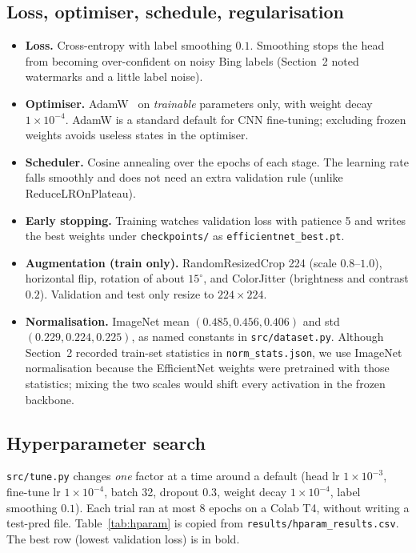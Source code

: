 \subsection{Loss, optimiser, schedule, regularisation}
\begin{itemize}
  \item \textbf{Loss.} Cross-entropy with label smoothing $0.1$. Smoothing
        stops the head from becoming over-confident on noisy Bing labels
        (Section~2 noted watermarks and a little label noise).
  \item \textbf{Optimiser.} AdamW~\cite{loshchilov2019adamw} on \emph{trainable}
        parameters only, with weight decay $1 \times 10^{-4}$. AdamW is a
        standard default for CNN fine-tuning; excluding frozen weights avoids
        useless states in the optimiser.
  \item \textbf{Scheduler.} Cosine annealing over the epochs of each stage.
        The learning rate falls smoothly and does not need an extra validation
        rule (unlike ReduceLROnPlateau).
  \item \textbf{Early stopping.} Training watches validation loss with
        patience 5 and writes the best weights under \texttt{checkpoints/}
        as \texttt{efficientnet\_best.pt}.
  \item \textbf{Augmentation (train only).} RandomResizedCrop 224 (scale
        $0.8$--$1.0$), horizontal flip, rotation of about $15^{\circ}$, and
        ColorJitter (brightness and contrast $0.2$). Validation and test
        only resize to $224 \times 224$.
  \item \textbf{Normalisation.} ImageNet mean $(0.485, 0.456, 0.406)$ and
        std $(0.229, 0.224, 0.225)$, as named constants in
        \texttt{src/dataset.py}. Although Section~2 recorded train-set
        statistics in \texttt{norm\_stats.json}, we use ImageNet normalisation
        because the EfficientNet weights were pretrained with those statistics;
        mixing the two scales would shift every activation in the frozen
        backbone.
\end{itemize}

\subsection{Hyperparameter search}
\texttt{src/tune.py} changes \emph{one} factor at a time around a default
(head lr $1 \times 10^{-3}$, fine-tune lr $1 \times 10^{-4}$, batch 32,
dropout $0.3$, weight decay $1 \times 10^{-4}$, label smoothing $0.1$).
Each trial ran at most 8 epochs on a Colab T4, without writing a test-pred
file. Table~\ref{tab:hparam} is copied from \texttt{results/hparam\_results.csv}.
The best row (lowest validation loss) is in bold.

